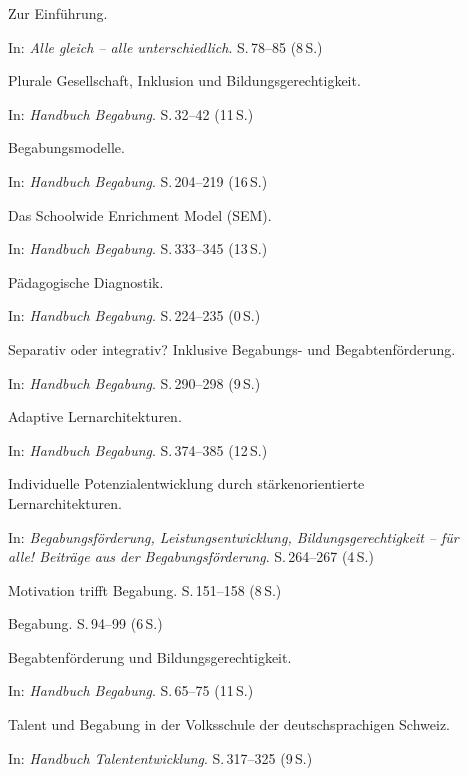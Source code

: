 \begin{description}
  \item[\cite{buholzerkummerwyss2010reaktionen}] Zur Einführung.
    
    In: \textit{Alle gleich -- alle unterschiedlich}.
    S.\,78--85 (8\,S.)

  \item[\cite{muelleroppliger2021plurale}] Plurale Gesellschaft, Inklusion und Bildungsgerechtigkeit.
    
    In: \textit{Handbuch Begabung}.
    S.\,32--42 (11\,S.)

  \item[\cite{muelleroppliger2021begabungsmodelle}] Begabungsmodelle.
    
    In: \textit{Handbuch Begabung}.
    S.\,204--219 (16\,S.)

  \item[\cite{reisrenzullimueller2021sem}] Das Schoolwide Enrichment Model (SEM).
    
    In: \textit{Handbuch Begabung}.
    S.\,333--345 (13\,S.)

  \item[\cite{muelleroppliger2021paeddiagnostik}] Pädagogische Diagnostik.
    
    In: \textit{Handbuch Begabung}.
    S.\,224--235 (0\,S.)

  \item[\cite{weigand2021separativ}] Separativ oder integrativ? Inklusive Begabungs- und Begabtenförderung.
    
    In: \textit{Handbuch Begabung}.
    S.\,290--298 (9\,S.)

  \item[\cite{muelleroppliger2021adaptive}] Adaptive Lernarchitekturen.
    
    In: \textit{Handbuch Begabung}.
    S.\,374--385 (12\,S.)

  \item[\cite{schulteterhardt2020potenzialentwicklung}] Individuelle Potenzialentwicklung durch stärkenorientierte Lernarchitekturen.
    
    In: \textit{Begabungsförderung, Leistungsentwicklung, Bildungsgerechtigkeit -- für alle! Beiträge aus der Begabungsförderung}.
    S.\,264--267 (4\,S.)

  \item[\cite{lehwald2017motivation}] Motivation trifft Begabung.
    S.\,151--158 (8\,S.)

  \item[\cite{hoyer2013begabung}] Begabung.
    S.\,94--99 (6\,S.)

  \item[\cite{sedmak2021bildungsgerechtigkeit}] Begabtenförderung und Bildungsgerechtigkeit.
    
    In: \textit{Handbuch Begabung}.
    S.\,65--75 (11\,S.)

  \item[\cite{grossenbacher2014integrative}] Talent und Begabung in der Volksschule der deutschsprachigen Schweiz.
    
    In: \textit{Handbuch Talententwicklung}.
    S.\,317--325 (9\,S.)

\end{description}

